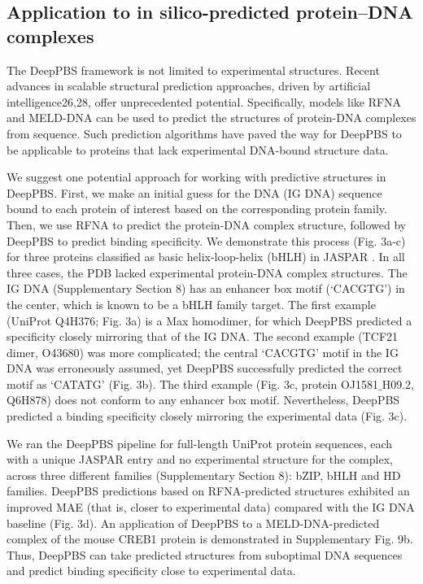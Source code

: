 \subsection{Application to in silico-predicted protein–DNA complexes}
The DeepPBS framework is not limited to experimental structures. Recent advances in scalable structural prediction approaches, driven by artificial intelligence26,28, offer unprecedented potential. Specifically, models like RFNA \citep{baek2024na} and MELD-DNA \citep{Esmaeeli2023} can be used to predict the structures of protein-DNA complexes from sequence. Such prediction algorithms have paved the way for DeepPBS to be applicable to proteins that lack experimental DNA-bound structure data.
\par
We suggest one potential approach for working with predictive structures in DeepPBS. First, we make an initial guess for the DNA (IG DNA) sequence bound to each protein of interest based on the corresponding protein family. Then, we use RFNA to predict the protein-DNA complex structure, followed by DeepPBS to predict binding specificity. We demonstrate this process (Fig. 3a-c) for three proteins classified as basic helix-loop-helix (bHLH) in JASPAR \citep{Jaime2022}. In all three cases, the PDB lacked experimental protein-DNA complex structures. The IG DNA (Supplementary Section 8) has an enhancer box motif (‘CACGTG’) in the center, which is known \citep{demartin2021} to be a bHLH family target. The first example (UniProt Q4H376; Fig. 3a) is a Max homodimer, for which DeepPBS predicted a specificity closely mirroring that of the IG DNA. The second example (TCF21 dimer, O43680) was more complicated; the central ‘CACGTG’ motif in the IG DNA was erroneously assumed, yet DeepPBS successfully predicted the correct motif as ‘CATATG’ (Fig. 3b). The third example (Fig. 3c, protein OJ1581$\_$H09.2, Q6H878) does not conform to any enhancer box motif. Nevertheless, DeepPBS predicted a binding specificity closely mirroring the experimental data (Fig. 3c).
\par
We ran the DeepPBS pipeline for full-length UniProt protein sequences, each with a unique JASPAR entry and no experimental structure for the complex, across three different families (Supplementary Section 8): bZIP, bHLH and HD families. DeepPBS predictions based on RFNA-predicted structures exhibited an improved MAE (that is, closer to experimental data) compared with the IG DNA baseline (Fig. 3d). An application of DeepPBS to a MELD-DNA-predicted complex of the mouse CREB1 protein is demonstrated in Supplementary Fig. 9b. Thus, DeepPBS can take predicted structures from suboptimal DNA sequences and predict binding specificity close to experimental data.
